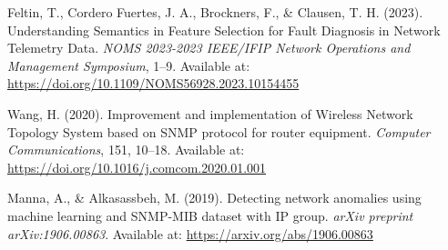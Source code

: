 \documentclass[11pt]{article}
\begin{document}
\begin{thebibliography}{9}
Feltin, T., Cordero Fuertes, J. A., Brockners, F., \& Clausen, T. H. (2023).
Understanding Semantics in Feature Selection for Fault Diagnosis in Network Telemetry Data.
\textit{NOMS 2023-2023 IEEE/IFIP Network Operations and Management Symposium}, 1--9.
Available at: \href{https://doi.org/10.1109/NOMS56928.2023.10154455}{https://doi.org/10.1109/NOMS56928.2023.10154455}

Wang, H. (2020).
Improvement and implementation of Wireless Network Topology System based on SNMP protocol for router equipment.
\textit{Computer Communications}, 151, 10--18.
Available at: \href{https://doi.org/10.1016/j.comcom.2020.01.001}{https://doi.org/10.1016/j.comcom.2020.01.001}

Manna, A., \& Alkasassbeh, M. (2019).
Detecting network anomalies using machine learning and SNMP-MIB dataset with IP group.
\textit{arXiv preprint arXiv:1906.00863}.
Available at: \href{https://arxiv.org/abs/1906.00863}{https://arxiv.org/abs/1906.00863}

\end{thebibliography}
\end{document}

